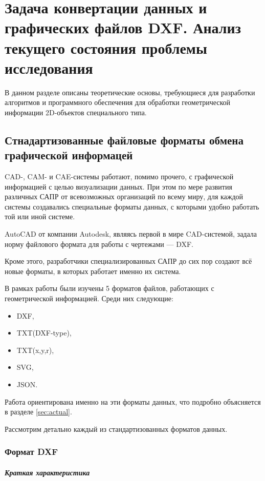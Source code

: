 \chapter{Задача конвертации данных и графических файлов DXF. Анализ текущего состояния проблемы исследования}
\label{cha:aktuell}

В данном разделе описаны теоретические основы, требующиеся для разработки алгоритмов и программного обеспечения для обработки геометрической информации 2D-объектов специального типа.

\section{Стнадартизованные файловые форматы обмена графической информацей}

CAD-, CAM- и CAE-системы работают, помимо прочего, с графической информацией с целью визуализации данных. При этом по мере развития различных САПР от всевозможных организаций по всему миру, для каждой системы создавались специальные форматы данных, с которыми удобно работать той или иной системе.

AutoCAD от компании Autodesk, являясь первой в мире CAD-системой, задала норму файлового формата для работы с чертежами --- DXF.

Кроме этого, разработчики специализированных САПР до сих пор создают всё новые форматы, в которых работает именно их система.

В рамках работы были изучены 5 форматов файлов, работающих с геометрической информацией. Среди них следующие:
\begin{itemize}
	\item DXF,
	\item TXT(DXF-type),
	\item TXT(x,y,r),
	\item SVG,
	\item JSON.
\end{itemize}

Работа ориентирована именно на эти форматы данных, что подробно объясняется в разделе  \ref{sec:actual}.

Рассмотрим детально каждый из стандартизованных форматов данных.

\subsection{Формат DXF}

\paragraph{Краткая характеристика}

